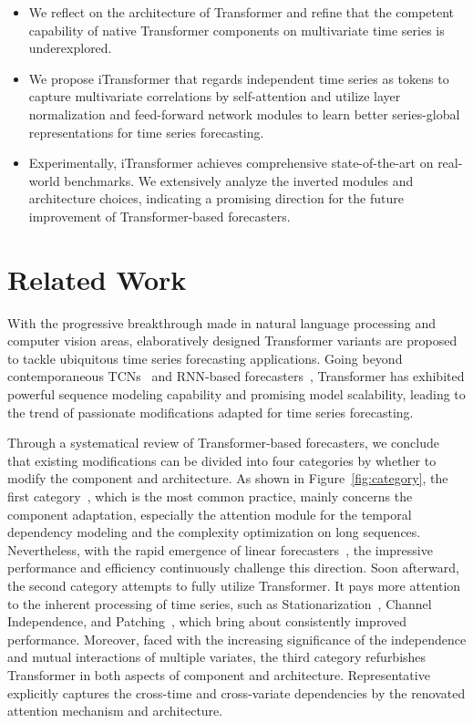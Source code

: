 \documentclass{article} %
\begin{document}
\begin{itemize}
  \item We reflect on the architecture of Transformer and refine that the competent capability of native Transformer components on multivariate time series is underexplored.
  \item We propose iTransformer that regards independent time series as tokens to capture multivariate correlations by self-attention and utilize layer normalization and feed-forward network modules to learn better series-global representations for time series forecasting.
  \item Experimentally, iTransformer achieves comprehensive state-of-the-art on real-world benchmarks. We extensively analyze the inverted modules and architecture choices, indicating a promising direction for the future improvement of Transformer-based forecasters.
\end{itemize}

\section{Related Work}

With the progressive breakthrough made in natural language processing and computer vision areas, elaboratively designed Transformer variants are proposed to tackle ubiquitous time series forecasting applications. Going beyond contemporaneous TCNs~\citep{bai1803empirical, SCINet} and RNN-based forecasters~\citep{LSTMnetwork, RNN1, salinas2020deepar}, Transformer has exhibited powerful sequence modeling capability and promising model scalability, leading to the trend of passionate modifications adapted for time series forecasting.

Through a systematical review of Transformer-based forecasters, we conclude that existing modifications can be divided into four categories by whether to modify the component and architecture. As shown in Figure~\ref{fig:category}, the first category~\citep{Autoformer, Informer, fedformer}, which is the most common practice, mainly concerns the component adaptation, especially the attention module for the temporal dependency modeling and the complexity optimization on long sequences. Nevertheless, with the rapid emergence of linear forecasters~\citep{Nbeats, DLinear, das2023long, liu2023koopa}, the impressive performance and efficiency continuously challenge this direction. Soon afterward, the second category attempts to fully utilize Transformer. It pays more attention to the inherent processing of time series, such as Stationarization~\citep{Stationary}, Channel Independence, and Patching~\citep{PatchTST}, which bring about consistently improved performance. Moreover, faced with the increasing significance of the independence and mutual interactions of multiple variates, the third category refurbishes Transformer in both aspects of component and architecture. Representative~\citep{Crossformer} explicitly captures the cross-time and cross-variate dependencies by the renovated attention mechanism and architecture.
\end{document}
